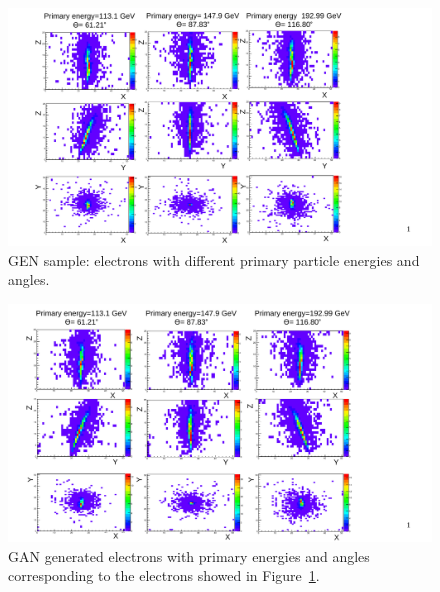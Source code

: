\begin{figure}[htbp]
    \includegraphics[width=\textwidth]{Images/Calo/GAN_g4_events.pdf}
    \caption{GEN sample: electrons with different primary particle energies and angles.}
    \label{fig:GEANT4_events}
\end{figure}

\begin{figure}[htbp]
    \includegraphics[width=\textwidth]{Images/Calo/GAN_gan_events.pdf}
    \caption{GAN generated electrons with primary energies and angles corresponding to the electrons showed in Figure~\ref{fig:GEANT4_events}.}
    \label{fig:GAN_events}
\end{figure}

